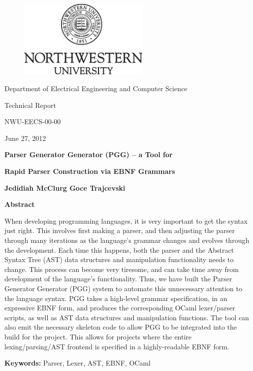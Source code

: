 \documentclass{article}
\begin{document}
\vspace{-3.0in}
\begin{figure}
\centering
\includegraphics[width=2.5in]{nwu}
\end{figure}

%
\centerline{\Large Department of Electrical Engineering and Computer Science}
\vspace{0.2in}

\centerline{\Large { Technical Report}}
\vspace{0.05in}
\centerline{\Large { NWU-EECS-00-00}}
\vspace{0.05in}
\centerline{\Large { June 27, 2012}}
\vspace{0.3in}

\centerline{\Large {\bf Parser Generator Generator (PGG) -- a Tool for}}
\centerline{\Large {\bf Rapid Parser Construction via EBNF Grammars}}
\vspace{0.3in}
\centerline{\large {\bf Jedidiah McClurg \hspace {0.2in} Goce Trajcevski}}
\vspace{0.8in}

\centerline{\large {\bf Abstract}}
\vspace{0.15in}
When developing programming languages, it is very important
to get the syntax just right.  This involves first making a
parser, and then adjusting the parser through many iterations
as the language's grammar changes and evolves through the
development.  Each time this happens, both the parser and
the Abstract Syntax Tree (AST) data structures and manipulation
functionality needs to change.  This process can become very
tiresome, and can take time away from development of the
language's functionality.  Thus, we have built the Parser
Generator Generator (PGG) system to automate this unnecessary
attention to the language syntax.  PGG takes a high-level
grammar specification, in an expressive EBNF form, and
produces the corresponding OCaml lexer/parser scripts, as
well as AST data structures and manipulation functions.  The
tool can also emit the necessary skeleton code to allow
PGG to be integrated into the build for the project.  This
allows for projects where the entire lexing/parsing/AST
frontend is specified in a highly-readable EBNF form.

\vspace{0.5in}
{\bf Keywords:} Parser, Lexer, AST, EBNF, OCaml
\end{document}
